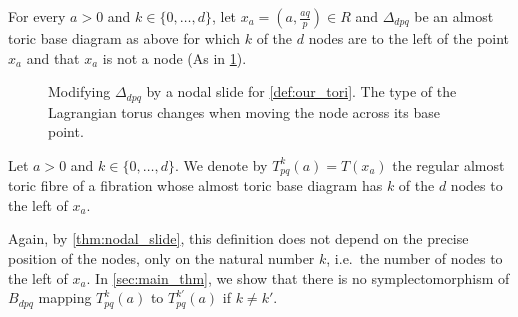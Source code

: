 \documentclass[12pt,a4paper,abstract=true,final]{scrartcl}
\begin{document}
For every $a > 0$ and $k \in \{0,\ldots,d\}$, let $x_a = \left( a,\frac{aq}{p} \right) \in R$ and $\Delta_{dpq}$ be an almost toric base diagram as above for which $k$ of the $d$ nodes are to the left of the point $x_a$ and that $x_a$ is not a node (As in \cref{fig:our_tori}).

\begin{figure}
  \centering
  \caption{Modifying $Δ_{dpq}$ by a nodal slide for \cref{def:our_tori}. The type of the Lagrangian torus changes when moving the node across its base point.}
  \label{fig:our_tori}
\end{figure}

\begin{definition}
  \label{def:our_tori}
    Let $a>0$ and $k \in \{0,\ldots,d\}$.
We denote by $T^k_{pq}(a) = T(x_a)$ the regular almost toric fibre of a fibration whose almost toric base diagram has $k$ of the $d$ nodes to the left of $x_a$. 
\end{definition}

Again, by \cref{thm:nodal_slide}, this definition does not depend on the precise position of the nodes, only on the natural number $k$, i.e.\ the number of nodes to the left of $x_a$.
In \cref{sec:main_thm}, we show that there is no symplectomorphism of $B_{dpq}$ mapping $T^k_{pq}(a)$ to $T^{k'}_{pq}(a)$ if $k \neq k'$.
\end{document}
